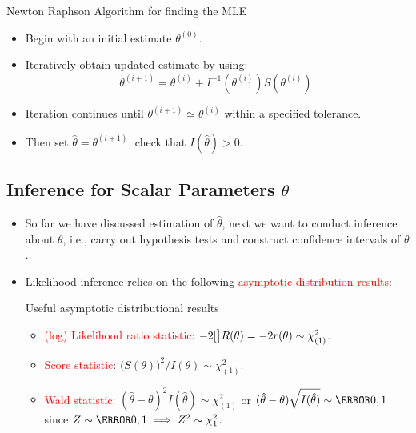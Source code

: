 \documentclass{article}\usepackage[]{graphicx}\usepackage[svgnames]{xcolor}
\let\log\relax%
\begin{document}
\begin{Regular}{Newton Raphson Algorithm for finding the MLE}
      \begin{itemize}
            \item Begin with an initial estimate $ \theta^{(0)} $.
            \item Iteratively obtain updated estimate by using:
                  \[ \theta^{(i+1)}=\theta^{(i)}+I^{-1}(\theta^{(i)})S(\theta^{(i)}). \]
            \item Iteration continues until $ \theta^{(i+1)}\simeq \theta^{(i)} $ within a specified tolerance.
            \item Then set $ \hat{\theta}=\theta^{(i+1)} $, check that $ I(\hat{\theta})>0 $.
      \end{itemize}
\end{Regular}
\subsection*{Inference for Scalar Parameters $ \theta $}
\begin{itemize}
      \item So far we have discussed estimation of $ \hat{\theta} $, next we want to conduct inference
            about $ \theta $, i.e., carry out hypothesis tests and construct confidence intervals of $ \theta $.
      \item Likelihood inference relies on the following \textcolor{Red}{asymptotic distribution results}:
            \begin{Regular}{Useful asymptotic distributional results}
                  \begin{itemize}
                        \item \textcolor{Red}{(log) Likelihood ratio statistic}: $ -2\log[\big]{R(\theta)}=-2r(\theta)\sim \chi^2_{(1)} $.
                        \item \textcolor{Red}{Score statistic}: $ \bigl(S(\theta)\bigr)^2/I(\theta)\sim \chi^2_{(1)} $.
                        \item \textcolor{Red}{Wald statistic}: $ (\hat{\theta}-\theta)^2 I(\hat{\theta}) \sim \chi^2_{(1)} $ or $ (\hat{\theta}-\theta)\sqrt{I(\hat{\theta})}\sim \N{0,1} $
                              since $ Z \sim \N{0,1} \implies Z^2 \sim \chi^2_{1} $.
                  \end{itemize}
            \end{Regular}
\end{itemize}
\end{document}
